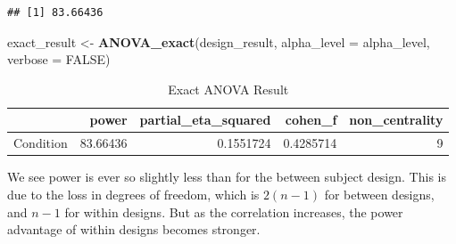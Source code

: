 \documentclass[]{book}
\newenvironment{Shaded}{\begin{snugshade}}{\end{snugshade}}
\newcommand{\CommentTok}[1]{\textcolor[rgb]{0.56,0.35,0.01}{\textit{#1}}}
\newcommand{\DataTypeTok}[1]{\textcolor[rgb]{0.13,0.29,0.53}{#1}}
\newcommand{\DecValTok}[1]{\textcolor[rgb]{0.00,0.00,0.81}{#1}}
\newcommand{\KeywordTok}[1]{\textcolor[rgb]{0.13,0.29,0.53}{\textbf{#1}}}
\newcommand{\NormalTok}[1]{#1}
\newcommand{\OperatorTok}[1]{\textcolor[rgb]{0.81,0.36,0.00}{\textbf{#1}}}
\newcommand{\OtherTok}[1]{\textcolor[rgb]{0.56,0.35,0.01}{#1}}
\newcommand{\StringTok}[1]{\textcolor[rgb]{0.31,0.60,0.02}{#1}}
\begin{document}
\begin{verbatim}
## [1] 83.66436
\end{verbatim}

\begin{Shaded}
\begin{Highlighting}[]
\NormalTok{exact_result <-}\StringTok{ }\KeywordTok{ANOVA_exact}\NormalTok{(design_result,}
                            \DataTypeTok{alpha_level =}\NormalTok{ alpha_level,}
                            \DataTypeTok{verbose =} \OtherTok{FALSE}\NormalTok{)}
\end{Highlighting}
\end{Shaded}

\begin{table}[!h]

\caption{\label{tab:unnamed-chunk-288}Exact ANOVA Result}
\centering
\begin{tabular}{l|r|r|r|r}
\hline
  & power & partial\_eta\_squared & cohen\_f & non\_centrality\\
\hline
Condition & 83.66436 & 0.1551724 & 0.4285714 & 9\\
\hline
\end{tabular}
\end{table}

We see power is ever so slightly less than for the between subject design. This is due to the loss in degrees of freedom, which is \(2(n-1)\) for between designs, and \(n-1\) for within designs. But as the correlation increases, the power advantage of within designs becomes stronger.

\begin{Shaded}
\end{Shaded}
\end{document}
